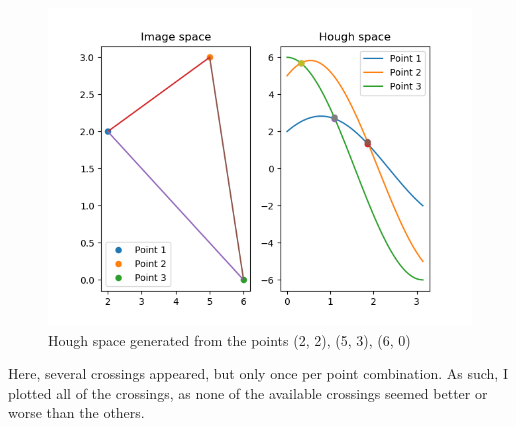 \documentclass[a4paper, titlepage,12pt]{article}
\begin{document}
	\begin{figure}[h!]
		\begin{center}
		\includegraphics[scale=0.8]{./pts_2.png}
			\caption{Hough space generated from the points (2, 2), (5, 3), (6, 0)}
		\end{center}
	\end{figure}

	Here, several crossings appeared, but only once per point combination. As such, I plotted all of the crossings, as none of the available crossings seemed better or worse than the others.
\end{document}
